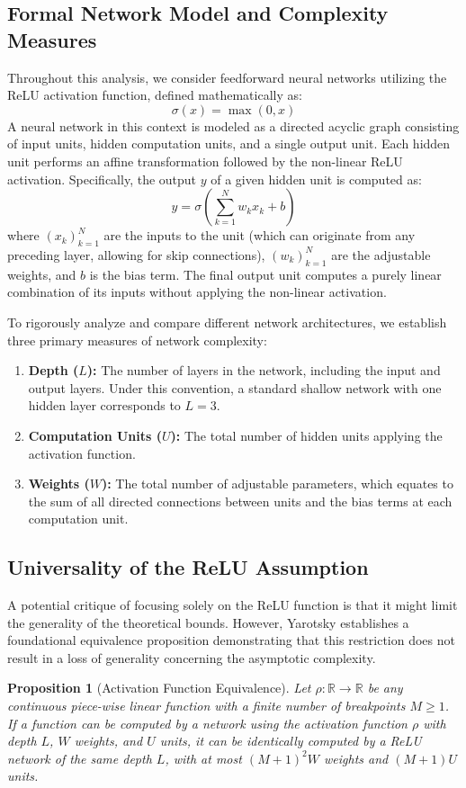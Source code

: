 \documentclass[12pt]{article}
\newtheorem{proposition}{Proposition}
\begin{document}
\subsection{Formal Network Model and Complexity Measures}
Throughout this analysis, we consider feedforward neural networks utilizing the ReLU activation function, defined mathematically as:
$$\sigma(x) = \max(0, x)$$
A neural network in this context is modeled as a directed acyclic graph consisting of input units, hidden computation units, and a single output unit. Each hidden unit performs an affine transformation followed by the non-linear ReLU activation. Specifically, the output $y$ of a given hidden unit is computed as:
$$y = \sigma\left(\sum_{k=1}^{N} w_k x_k + b\right)$$
where $(x_k)_{k=1}^N$ are the inputs to the unit (which can originate from any preceding layer, allowing for skip connections), $(w_k)_{k=1}^N$ are the adjustable weights, and $b$ is the bias term. The final output unit computes a purely linear combination of its inputs without applying the non-linear activation.

To rigorously analyze and compare different network architectures, we establish three primary measures of network complexity:
\begin{enumerate}
    \item \textbf{Depth ($L$):} The number of layers in the network, including the input and output layers. Under this convention, a standard shallow network with one hidden layer corresponds to $L=3$.
    \item \textbf{Computation Units ($U$):} The total number of hidden units applying the activation function.
    \item \textbf{Weights ($W$):} The total number of adjustable parameters, which equates to the sum of all directed connections between units and the bias terms at each computation unit.
\end{enumerate}

\subsection{Universality of the ReLU Assumption}
A potential critique of focusing solely on the ReLU function is that it might limit the generality of the theoretical bounds. However, Yarotsky establishes a foundational equivalence proposition demonstrating that this restriction does not result in a loss of generality concerning the asymptotic complexity.

\begin{proposition}[Activation Function Equivalence]
Let $\rho: \mathbb{R} \to \mathbb{R}$ be any continuous piece-wise linear function with a finite number of breakpoints $M \ge 1$. If a function can be computed by a network using the activation function $\rho$ with depth $L$, $W$ weights, and $U$ units, it can be identically computed by a ReLU network of the same depth $L$, with at most $(M+1)^2 W$ weights and $(M+1)U$ units.
\end{proposition}
\end{document}
